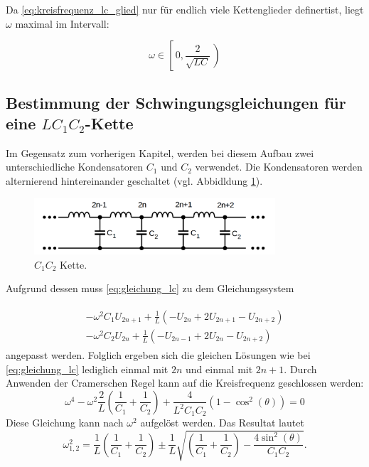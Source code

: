 Da \eqref{eq:kreisfrequenz_lc_glied} nur für endlich viele Kettenglieder definertist,
liegt $\omega$ maximal im Intervall: %

\begin{equation}
\label{eq:menge_omega_lc_glied}
\omega\in\left[\,0,\frac{2}{\sqrt{LC}}\,\right)
\end{equation}

\subsection{Bestimmung der Schwingungsgleichungen für eine $LC_1C_2$-Kette}
Im Gegensatz zum vorherigen Kapitel, werden bei diesem Aufbau zwei unterschiedliche
Kondensatoren $C_1$ und $C_2$ verwendet. Die Kondensatoren werden
alternierend hintereinander geschaltet (vgl. Abbidldung \ref{fig:alternierende_kette}).

\begin{figure}
  \centering
  \includegraphics[width=0.8\textwidth]{bilder/alternierende_kette.png}
  \caption{$C_1C_2$ Kette.\cite{anleitung356}}
  \label{fig:alternierende_kette}
\end{figure}


Aufgrund dessen muss \eqref{eq:gleichung_lc} zu dem Gleichungssystem

\begin{align}
\label{eq:lc1c2_gleichungsy}
\begin{aligned}
-\omega^2C_1U_{2n+1}+\frac{1}{L}\left(-U_{2n}+2U_{2n+1}-U_{2n+2}\right)\\
-\omega^2C_2U_{2n}+\frac{1}{L}\left(-U_{2n-1}+2U_{2n}-U_{2n+2}\right)
\end{aligned}
\end{align}
angepasst werden.
Folglich ergeben sich die gleichen Lösungen wie bei \eqref{eq:gleichung_lc}
lediglich einmal mit $2n$ und einmal mit $2n+1$.
Durch Anwenden der Cramerschen Regel kann auf die Kreisfrequenz geschlossen werden: %
\begin{equation*}
\omega^4-\omega^2\frac{2}{L}\left(\frac{1}{C_1}+\frac{1}{C_2}\right)+\frac{4}{L^2C_1C_2}\left(1-\cos^2(\theta)\right)=0
\end{equation*}
Diese Gleichung kann nach $\omega^2$ aufgelöst werden.
Das Resultat lautet %
\begin{equation}
\label{eq:omega_ceins_czwei}
\omega_{1,2}^{2}=\frac{1}{L}\left(\frac{1}{C_1}+\frac{1}{C_2}\right)\pm\frac{1}{L}\sqrt{\left(\frac{1}{C_1}+\frac{1}{C_2}\right)-\frac{4\sin^2(\theta)}{C_1C_2}}.
\end{equation}

